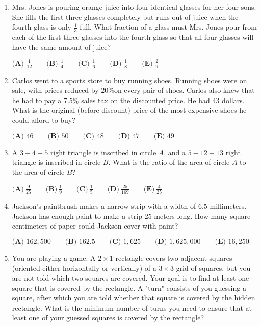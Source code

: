 \documentclass{article}
\begin{document}
\begin{enumerate}[label=\arabic*., itemsep=0.5em]\item Mrs. Jones is pouring orange juice into four identical glasses for her four sons. She fills the first three glasses completely but runs out of juice when the fourth glass is only \(\frac{1}{3}\) full. What fraction of a glass must Mrs. Jones pour from each of the first three glasses into the fourth glass so that all four glasses will have the same amount of juice?

\(\textbf{(A) }\frac{1}{12}\qquad\textbf{(B) }\frac{1}{4}\qquad\textbf{(C) }\frac{1}{6}\qquad\textbf{(D) }\frac{1}{8}\qquad\textbf{(E) }\frac{2}{9}\)\par \vspace{0.5em}\item Carlos went to a sports store to buy running shoes. Running shoes were on sale, with prices reduced by \(20\%\)on every pair of shoes. Carlos also knew that he had to pay a \(7.5\%\) sales tax on the discounted price. He had \(43\) dollars. What is the original (before discount) price of the most expensive shoes he could afford to buy?

\(\textbf{(A) }46\qquad\textbf{(B) }50\qquad\textbf{(C) }48\qquad\textbf{(D) }47\qquad\textbf{(E) }49\)\par \vspace{0.5em}\item A \(3-4-5\) right triangle is inscribed in circle \(A\), and a \(5-12-13\) right triangle is inscribed in circle \(B\). What is the ratio of the area of circle \(A\) to the area of circle \(B\)?

\(\textbf{(A)}~\frac{9}{25}\qquad\textbf{(B)}~\frac{1}{9}\qquad\textbf{(C)}~\frac{1}{5}\qquad\textbf{(D)}~\frac{25}{169}\qquad\textbf{(E)}~\frac{4}{25}\)\par \vspace{0.5em}\item Jackson's paintbrush makes a narrow strip with a width of \(6.5\) millimeters. Jackson has enough paint to make a strip \(25\) meters long. How many square centimeters of paper could Jackson cover with paint?

\(\textbf{(A) }162,500\qquad\textbf{(B) }162.5\qquad\textbf{(C) }1,625\qquad\textbf{(D) }1,625,000\qquad\textbf{(E) }16,250\)\par \vspace{0.5em}\item You are playing a game. A \(2 \times 1\) rectangle covers two adjacent squares (oriented either horizontally or vertically) of a \(3 \times 3\) grid of squares, but you are not told which two squares are covered. Your goal is to find at least one square that is covered by the rectangle. A "turn" consists of you guessing a square, after which you are told whether that square is covered by the hidden rectangle. What is the minimum number of turns you need to ensure that at least one of your guessed squares is covered by the rectangle?


\end{enumerate}
\end{document}
